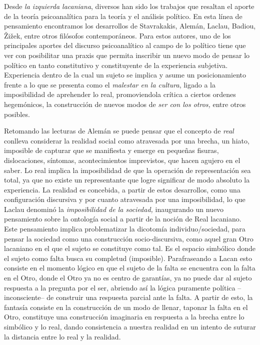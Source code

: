 Desde \emph{la izquierda lacaniana}, diversos han sido los trabajos que resaltan el aporte de la teoría psicoanalítica para la teoría y el análisis político. En esta línea de pensamiento encontramos los desarrollos de Stavrakakis, Alemán, Laclau, Badiou, Žižek, entre otros filósofos contemporáneos. Para estos autores, uno de los principales aportes del discurso psicoanalítico al campo de lo político tiene que ver con posibilitar una praxis que permita inscribir un nuevo modo de pensar lo político en tanto constitutivo y constituyente de la experiencia subjetiva. Experiencia dentro de la cual un sujeto se implica y asume un posicionamiento frente a lo que se presenta como el \emph{malestar en la cultura}, ligado a la imposibilidad de aprehender lo real, promoviendola crítica a ciertos ordenes hegemónicos, la construcción de nuevos modos de \emph{ser con los otros, }entre otros posibles.

Retomando las lecturas de Alemán se puede pensar que el concepto de \emph{real} conlleva considerar la realidad social como atravesada por una brecha, un hiato, imposible de capturar que se manifiesta y emerge en pequeñas fisuras, dislocaciones, síntomas, acontecimientos imprevistos, que hacen agujero en el saber. Lo real implica la imposibilidad de que la operación de representación sea total, ya que no existe un representante que logre significar de modo absoluto la experiencia. La realidad es concebida, a partir de estos desarrollos, como una configuración discursiva y por cuanto atravesada por una imposibilidad, lo que Laclau denominó la \emph{imposibilidad de la sociedad, }inaugurando un nuevo pensamiento sobre la ontología social a partir de la noción de Real lacaniano. Este pensamiento implica problematizar la dicotomía individuo/sociedad, para pensar la sociedad como una construcción socio-discursiva, como aquel gran Otro lacaniano en el que el sujeto se constituye como tal. Es el espacio simbólico donde el sujeto como falta busca su completud (imposible). Parafraseando a Lacan esto consiste en el momento lógico en que el sujeto de la falta se encuentra con la falta en el Otro, donde el Otro ya no es centro de garantías, ya no puede dar al sujeto respuesta a la pregunta por el ser, abriendo así la lógica puramente política --inconsciente-- de construir una respuesta parcial ante la falta. A partir de esto, la fantasía consiste en la construcción de un modo de llenar, taponar la falta en el Otro, constituye una construcción imaginaria en respuesta a la brecha entre lo simbólico y lo real, dando consistencia a nuestra realidad en un intento de suturar la distancia entre lo real y la realidad.

